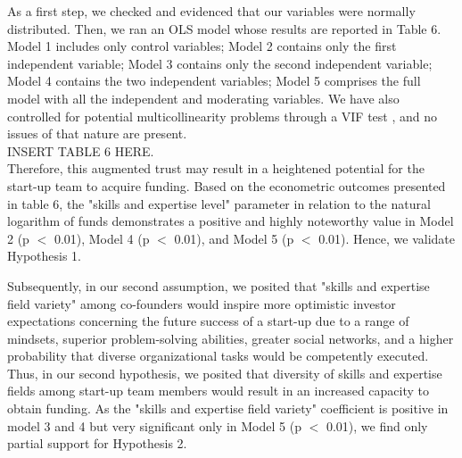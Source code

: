 \documentclass[12pt]{article}
\begin{document}
As a first step, we checked and evidenced that our variables were normally distributed. Then, we ran an OLS model whose results are reported in Table 6\label{table6}. Model 1 includes only control variables; Model 2 contains only the first independent variable; Model 3 contains only the second independent variable; Model 4 contains the two independent variables; Model 5 comprises the full model with all the independent and moderating variables. We have also controlled for potential multicollinearity problems through a VIF test \citep{james2013introduction}, and no issues of that nature are present. \\

INSERT TABLE 6 HERE. \\

Therefore, this augmented trust may result in a heightened potential for the start-up team to acquire funding. Based on the econometric outcomes presented in table 6, the "skills and expertise level" parameter in relation to the natural logarithm of funds demonstrates a positive and highly noteworthy value in Model 2 (p $<$ 0.01), Model 4 (p $<$ 0.01), and Model 5 (p $<$ 0.01). Hence, we validate Hypothesis 1.

Subsequently, in our second assumption, we posited that "skills and expertise field variety" among co-founders would inspire more optimistic investor expectations concerning the future success of a start-up due to a range of mindsets, superior problem-solving abilities, greater social networks, and a higher probability that diverse organizational tasks would be competently executed. Thus, in our second hypothesis, we posited that diversity of skills and expertise fields among start-up team members would result in an increased capacity to obtain funding. As the "skills and expertise field variety" coefficient is positive in model 3 and 4 but very significant only in Model 5 (p $<$ 0.01), we find only partial support for Hypothesis 2.
\end{document}
